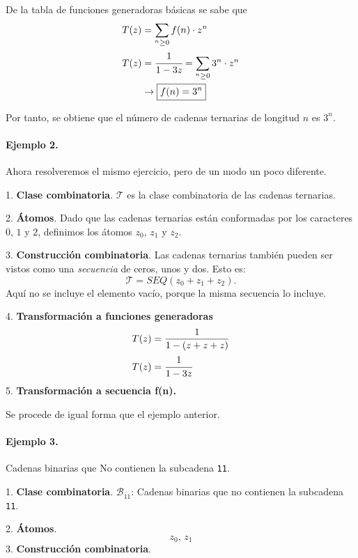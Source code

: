 De la tabla de funciones generadoras básicas se sabe que
\begin{align*}
    T(z) &= \sum_{^n\ge 0}f(n)\cdot z^n\\
    T(z) &=\cfrac{1}{1-3z}=\sum_{^n\ge 0}3^n\cdot z^n\\
    &\to \boxed{f(n)=3^n}
\end{align*}

Por tanto, se obtiene que el número de cadenas ternarias de longitud $n$ es $3^n$.

\paragraph{Ejemplo 2.}
Ahora resolveremos el mismo ejercicio, pero de un modo un poco diferente.

1. \textbf{Clase combinatoria}.
$\mathcal{T}$ es la clase combinatoria de las cadenas ternarias.

2. \textbf{Átomos}.
Dado que las cadenas ternarias están conformadas por los caracteres $0$, $1$ y $2$, definimos los átomos $z_0,\,z_1$ y $z_2$.

3. \textbf{Construcción combinatoria}.
Las cadenas ternarias también pueden ser vistos como una \textit{secuencia} de ceros, unos y dos. Esto es:
\begin{equation*}
    \mathcal{T} = SEQ(z_0 + z_1 + z_2).
\end{equation*}
{\color{magenta} Aquí no se incluye el elemento vacío, porque la misma secuencia lo incluye.}

4. \textbf{Transformación a funciones generadoras}
\begin{equation*}
\begin{split}
    T(z) &= \frac{1}{1-(z + z + z)}\\
    T(z) &= \cfrac{1}{1-3z}
\end{split}
\end{equation*}
5. \textbf{Transformación a secuencia f(n).}

Se procede de igual forma que el ejemplo anterior.

\paragraph{Ejemplo 3.}
Cadenas binarias que No contienen la subcadena \texttt{11}.

1. \textbf{Clase combinatoria}.
$\mathcal{B}_{\overline{11}}$: Cadenas binarias que no contienen la subcadena \texttt{11}.

2. \textbf{Átomos}.
$$z_0,\,z_1$$
3. \textbf{Construcción combinatoria}.


